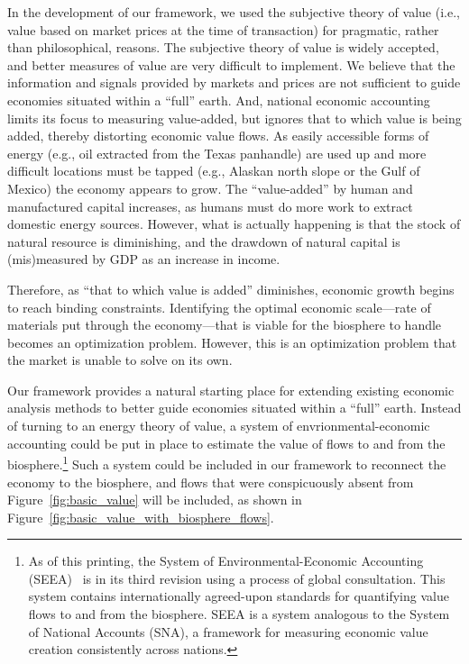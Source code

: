 In the development of our framework, we used the subjective theory of value 
(i.e., value based on market prices at the time of transaction) 
for pragmatic, rather than philosophical, reasons.
The subjective theory of value is widely accepted, and
better measures of value are very difficult to implement.
We believe that the information and signals provided by markets and prices 
are not sufficient to guide economies situated within a ``full'' earth.
And, national economic accounting limits its focus to measuring value-added, 
but ignores that to which value is being added,
thereby distorting economic value flows. 
As easily accessible forms of energy 
(e.g., oil extracted from the Texas panhandle) 
are used up and more difficult locations must be tapped 
(e.g., Alaskan north slope or the Gulf of Mexico) 
the economy appears to grow.
The ``value-added'' by human and manufactured capital increases, 
as humans must do more work to extract domestic energy sources. 
However, what is actually happening is that the stock 
of natural resource is diminishing, 
and the drawdown of natural capital is (mis)measured by GDP as 
an increase in income.\cite[pp.~66~and~75]{Daly1997}

Therefore, as ``that to which value is added'' diminishes, 
economic growth begins to reach binding constraints. 
Identifying the optimal economic 
scale---rate of materials put through the economy---that 
is viable for the biosphere to handle becomes an optimization problem. 
However, this is an optimization 
problem that the market is unable to solve on its own. 

Our framework provides a natural starting place for extending 
existing economic analysis methods to better
guide economies situated within a ``full'' earth. 
Instead of turning to an energy theory of value,
a system of envrionmental-economic accounting 
could be put in place to estimate the value 
of flows to and from the biosphere.\footnote{As of this printing, 
	the System of Environmental-Economic Accounting (SEEA)~\cite{UNSEEA:aa}
	is in its third revision 
	using a process of global consultation. 
	This system contains internationally agreed-upon standards for quantifying value flows 
	to and from the biosphere. 
	SEEA is a system analogous to the System of National Accounts (SNA), 
	a framework for measuring economic value creation consistently across nations.} 
Such a system could be included in our framework
to reconnect the economy to the biosphere, 
and flows that were conspicuously 
absent from Figure~\ref{fig:basic_value} will
be included, as shown in Figure~\ref{fig:basic_value_with_biosphere_flows}.

